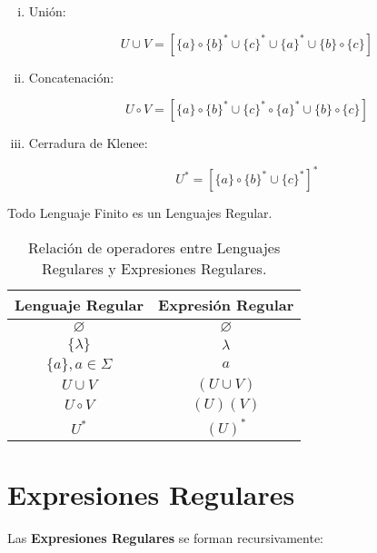 \begin{enumerate}[i.]

\item {}Unión:

\begin{equation}
U \cup V =  [\{a\} \circ \{b\}^* \cup \{c\}^* \cup \{a\}^* \cup \{b\} \circ 
\{c\}]
\end{equation}


\item {}Concatenación:

\begin{equation}
U \circ V =  [\{a\} \circ \{b\}^* \cup \{c\}^* \circ \{a\}^* \cup \{b\} \circ 
\{c\}]
\end{equation}

\item {}Cerradura de Klenee: 

\begin{equation}
U^{*} =  [\{a\} \circ \{b\}^* \cup \{c\}^*]^*
\end{equation}


\end{enumerate}

{\cor Todo Lenguaje Finito es un Lenguajes Regular.}

\begin{table}
\begin{center}

\begin{tabular}{|c|c|}\hline
\textbf{Lenguaje Regular} & \textbf{Expresión Regular} \\ \hline
\hline
$\varnothing$ & $\varnothing$\\ \hline
$\{\lambda \}$ & $\lambda$\\ \hline
$\{a\}, a \in \Sigma$ & $a$\\ \hline
$U \cup V$ & $(U \cup V)$\\ \hline
$U \circ V$ & $(U)(V)$\\ \hline
$U^*$ & $(U)^*$\\ \hline
\end{tabular} 
\caption{Relación de operadores entre Lenguajes Regulares y Expresiones 
Regulares.}
 
\end{center}
\end{table}


\section{Expresiones Regulares}\label{sec:expresionesRegulares}
 Las \textbf{Expresiones Regulares} se forman recursivamente:

